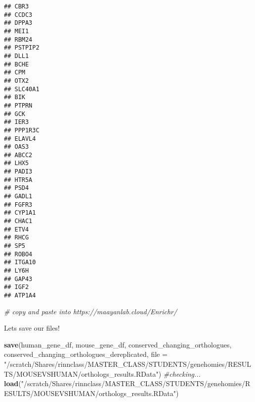 \documentclass[
]{article}
\newenvironment{Shaded}{\begin{snugshade}}{\end{snugshade}}
\newcommand{\AttributeTok}[1]{\textcolor[rgb]{0.13,0.29,0.53}{#1}}
\newcommand{\CommentTok}[1]{\textcolor[rgb]{0.56,0.35,0.01}{\textit{#1}}}
\newcommand{\FunctionTok}[1]{\textcolor[rgb]{0.13,0.29,0.53}{\textbf{#1}}}
\newcommand{\NormalTok}[1]{#1}
\newcommand{\StringTok}[1]{\textcolor[rgb]{0.31,0.60,0.02}{#1}}
\begin{document}
\begin{verbatim}
## CBR3
## CCDC3
## DPPA3
## MEI1
## RBM24
## PSTPIP2
## DLL1
## BCHE
## CPM
## OTX2
## SLC40A1
## BIK
## PTPRN
## GCK
## IER3
## PPP1R3C
## ELAVL4
## OAS3
## ABCC2
## LHX5
## PADI3
## HTR5A
## PSD4
## GADL1
## FGFR3
## CYP1A1
## CHAC1
## ETV4
## RHCG
## SP5
## ROBO4
## ITGA10
## LY6H
## GAP43
## IGF2
## ATP1A4
\end{verbatim}

\begin{Shaded}
\begin{Highlighting}[]
\CommentTok{\# copy and paste into https://maayanlab.cloud/Enrichr/ }
\end{Highlighting}
\end{Shaded}

Lets save our files!

\begin{Shaded}
\begin{Highlighting}[]
\FunctionTok{save}\NormalTok{(human\_gene\_df, mouse\_gene\_df, conserved\_changing\_orthologues, conserved\_changing\_orthologues\_dereplicated, }\AttributeTok{file =} \StringTok{"/scratch/Shares/rinnclass/MASTER\_CLASS/STUDENTS/genehomies/RESULTS/MOUSEVSHUMAN/orthologs\_results.RData"}\NormalTok{)}
\CommentTok{\#checking... }
\FunctionTok{load}\NormalTok{(}\StringTok{"/scratch/Shares/rinnclass/MASTER\_CLASS/STUDENTS/genehomies/RESULTS/MOUSEVSHUMAN/orthologs\_results.RData"}\NormalTok{)}
\end{Highlighting}
\end{Shaded}
\end{document}
